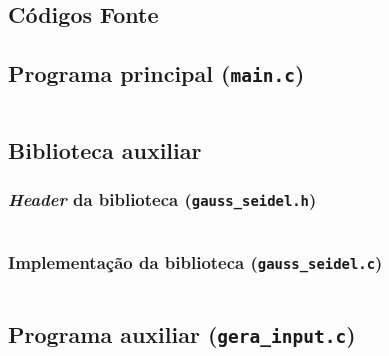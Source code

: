 \begin{apendicesenv}

\partapendices

\chapter{Códigos Fonte}

	\section{Programa principal (\texttt{main.c})}
		\inputminted[autogobble,breaklines,linenos,frame=lines,tabsize=4,obeytabs=true,fontsize=\footnotesize
		]{c}{source_codes/main.c}
		\label{lst:main.c}

	\section{Biblioteca auxiliar}
		\subsection{\emph{Header} da biblioteca (\texttt{gauss\_seidel.h})}
			\inputminted[autogobble,breaklines,linenos,frame=lines,tabsize=4,obeytabs=true,fontsize=\footnotesize
			]{c}{source_codes/gauss_seidel.h}
			\label{lst:gauss_seidel.h}

		\subsection{Implementação da biblioteca (\texttt{gauss\_seidel.c})}
			\inputminted[autogobble,breaklines,linenos,frame=lines,tabsize=4,obeytabs=true,fontsize=\footnotesize
			]{c}{source_codes/gauss_seidel.c}
			\label{lst:gauss_seidel.c}

	\section{Programa auxiliar (\texttt{gera\_input.c})}
		\inputminted[autogobble,breaklines,linenos,frame=lines,tabsize=4,obeytabs=true,fontsize=\footnotesize
			]{c}{source_codes/gera_input.c}
			\label{lst:gera_input.c}

\end{apendicesenv}